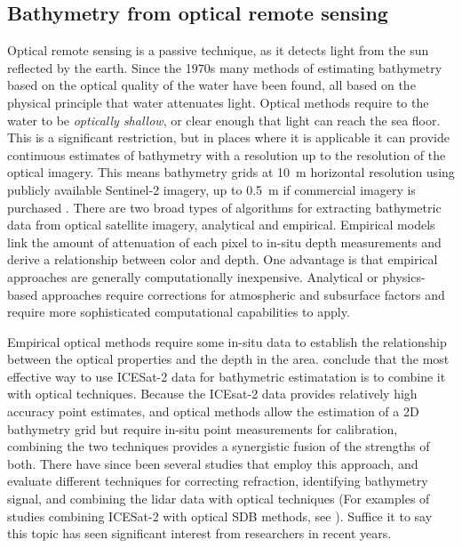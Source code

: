 \subsection{Bathymetry from optical remote sensing}
Optical remote sensing is a passive technique, as it detects light from the sun reflected by the earth. Since the 1970s many methods of estimating bathymetry based on the optical quality of the water have been found, all based on the physical principle that water attenuates light. Optical methods require to the water to be \emph{optically shallow}, or clear enough that light can reach the sea floor. This is a significant restriction, but in places where it is applicable it can provide continuous estimates of bathymetry with a resolution up to the resolution of the optical imagery. This means bathymetry grids at 10~m horizontal resolution using publicly available Sentinel-2 imagery, up to 0.5~m if commercial imagery is purchased \parencite{Babbel2021a,LeQuilleuc2022b,Pike2019}. There are two broad types of algorithms for extracting bathymetric data from optical satellite imagery, analytical and empirical. Empirical models link the amount of attenuation of each pixel to in-situ depth measurements and derive a relationship between color and depth. One advantage is that empirical approaches are generally computationally inexpensive. Analytical or physics-based approaches require corrections for atmospheric and subsurface factors \parencite{Turner2021} and require more sophisticated computational capabilities to apply.

Empirical optical methods require some in-situ data to establish the relationship between the optical properties and the depth in the area. \cite{Parrish2019} conclude that the most effective way to use ICESat-2 data for bathymetric estimatation is to combine it with optical techniques. Because the ICEsat-2 data provides relatively high accuracy point estimates, and optical methods allow the estimation of a 2D bathymetry grid but require in-situ point measurements for calibration, combining the two techniques provides a synergistic fusion of the strengths of both. There have since been several studies that employ this approach, and evaluate different techniques for correcting refraction, identifying bathymetry signal, and combining the lidar data with optical techniques (For examples of studies combining ICESat-2 with optical SDB methods, see \cite{Geyman2019,Pike2019,Ma2020,Lee2021,Albright2021,Ranndal2021,Gleason2021,Thomas2021d,Babbel2021a,Hsu2021,Cao2021,Xie2021,Surisetty2022,Zhong2022a,Zheng2022,Daly2022,Xu2022,Magruder2020,Thomas2022,LeQuilleuc2022b}). Suffice it to say this topic has seen significant interest from researchers in recent years.

